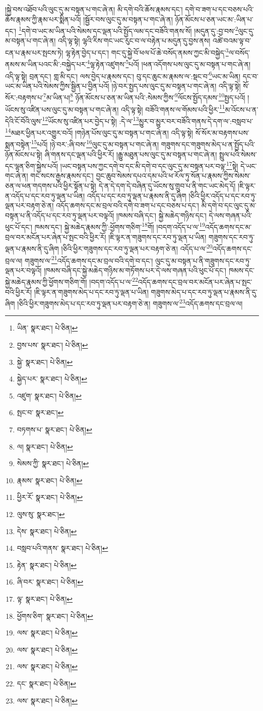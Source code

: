 །སྐྱེ་བས་འཐོབ་པའི་ལུང་དུ་མ་བསྟན་པ་གང་ཞེ་ན། མི་དགེ་བའི་ཆོས་རྣམས་དང་། དགེ་བ་ཟག་པ་དང་བཅས་པའི་ཆོས་རྣམས་ཀྱི་རྣམ་པར་སྨིན་པའོ། །སྦྱོར་བས་ལུང་དུ་མ་བསྟན་པ་གང་ཞེ་ན། ཉོན་མོངས་པ་ཅན་ཡང་མ་:ཡིན་པ་དང་། \footnote{ཡིན་  སྣར་ཐང་།  པེ་ཅིན། }དགེ་བ་ཡང་མ་ཡིན་པའི་སེམས་དང་ལྡན་པའི་སྤྱོད་ལམ་དང་བཟོའི་གནས་སོ། །མདུན་དུ་:བྱ་བས་\footnote{བྱས་པས་  སྣར་ཐང་།  པེ་ཅིན། }ལུང་དུ་མ་བསྟན་པ་གང་ཞེ་ན། འདི་ལྟ་སྟེ། ལྷའི་རིས་གང་ཡང་རུང་བ་ལ་བརྟེན་པ་མདུན་དུ་བྱས་ནས། འཚེ་བའམ་ལྟ་བ་ངན་པ་རྣམ་པར་སྤངས་ཏེ། ལྷ་རྟེན་བྱེད་པ་དང་། གང་དུ་སྐྱེ་བོ་ཕལ་པོ་ཆེ་བསོད་ནམས་ཀྱང་མི་བསྐྱེད་\footnote{སྐྱེ་  སྣར་ཐང་།  པེ་ཅིན། }ལ་བསོད་ནམས་མ་ཡིན་པའང་མི་:བསྐྱེད་པར་\footnote{སྐྱེད་པར་  སྣར་ཐང་།  པེ་ཅིན། }ལྷ་རྟེན་འཛུགས་\footnote{འཛུག་  སྣར་ཐང་།  པེ་ཅིན། }པའོ། །ཕན་འདོགས་པས་ལུང་དུ་མ་བསྟན་པ་གང་ཞེ་ན། འདི་ལྟ་སྟེ། བྲན་དང་། གླ་མི་དང་། ལས་བྱེད་པ་རྣམས་དང་། བུ་དང་ཆུང་མ་རྣམས་ལ་:སྡང་བ་\footnote{སྤང་བ་  སྣར་ཐང་། }ཡང་མ་ཡིན། དང་བ་ཡང་མ་ཡིན་པའི་སེམས་ཀྱིས་སྦྱིན་པ་བྱིན་པའོ། །ཉེ་བར་སྤྱད་པས་ལུང་དུ་མ་བསྟན་པ་གང་ཞེ་ན། འདི་ལྟ་སྟེ། སོ་སོར་:བརྟགས་པ་\footnote{བཏགས་པ་  སྣར་ཐང་།  པེ་ཅིན། }མ་ཡིན་པ།\footnote{ལ།  སྣར་ཐང་།  པེ་ཅིན། } ཉོན་མོངས་པ་ཅན་མ་ཡིན་པའི་:སེམས་ཀྱིས་\footnote{སེམས་ཀྱི་  སྣར་ཐང་།  པེ་ཅིན། }ལོངས་སྤྱོད་དམས་\footnote{རྣམས་  སྣར་ཐང་།  པེ་ཅིན། }སྤྱད་པའོ། །ཡོངས་སུ་འཛིན་པས་ལུང་དུ་མ་བསྟན་པ་གང་ཞེ་ན། འདི་ལྟ་སྟེ། བཟོའི་གནས་ལ་གོམས་པའི་ཕྱིར་\footnote{ཕྱིར་རོ་  སྣར་ཐང་།  པེ་ཅིན། }མ་འོངས་པ་ན་དེའི་ངོ་བོའི་ལུས་\footnote{ལུས་སུ་  སྣར་ཐང་། }ཡོངས་སུ་འཛིན་པར་བྱེད་པ་སྟེ། :དེ་ལ་\footnote{དེས་  སྣར་ཐང་།  པེ་ཅིན། }མྱུར་བ་མྱུར་བར་བཟོའི་གནས་དེ་དག་ལ་:བསླབ་པ་\footnote{བསླབ་པའི་གནས་  སྣར་ཐང་།  པེ་ཅིན། }མཐར་ཕྱིན་པར་འགྱུར་བའོ། །གཉེན་པོས་ལུང་དུ་མ་བསྟན་པ་གང་ཞེ་ན། འདི་ལྟ་སྟེ། སོ་སོར་མ་བརྟགས་པས་སྨན་བསྟེན་\footnote{རྟེན་  སྣར་ཐང་།  པེ་ཅིན། }པའོ། །ཉེ་བར་:ཞི་བས་\footnote{ཞི་བར་  སྣར་ཐང་།  པེ་ཅིན། }ལུང་དུ་མ་བསྟན་པ་གང་ཞེ་ན། གཟུགས་དང་གཟུགས་མེད་པ་ན་སྤྱོད་པའི་ཉོན་མོངས་པ་སྟེ། ཞི་གནས་དང་ལྡན་པའི་ཕྱིར་རོ། །རྒྱུ་མཐུན་པས་ལུང་དུ་མ་བསྟན་པ་གང་ཞེ་ན། སྤྲུལ་པའི་སེམས་དང་ལྷན་ཅིག་སྐྱེས་པའོ། །ཡང་བསྟན་པས་ཀྱང་དགེ་བ་དང་མི་དགེ་བ་དང་ལུང་དུ་མ་བསྟན་པར་བལྟ་\footnote{ལྟ་  སྣར་ཐང་།  པེ་ཅིན། }སྟེ། དེ་ཡང་གང་ཞེ་ན། གང་སངས་རྒྱས་རྣམས་དང་། བྱང་ཆུབ་སེམས་དཔའ་དམ་པའི་ཕ་རོལ་ཏུ་སོན་པ་རྣམས་ཀྱིས་སེམས་ཅན་ལ་ཕན་གདགས་པའི་ཕྱིར་སྟོན་པ་སྟེ། དེ་ན་དེ་དག་དེ་བཞིན་དུ་ཡོངས་སུ་གྲུབ་པ་ནི་གང་ཡང་མེད་དོ། །ཇི་ལྟར་ན་འདོད་པ་དང་རབ་ཏུ་ལྡན་པ་ཡིན། འདོད་པ་དང་རབ་ཏུ་ལྡན་པ་རྣམས་ནི་དུ་ཞིག །ཅིའི་ཕྱིར་འདོད་པ་དང་རབ་ཏུ་ལྡན་པར་བརྟག་ཅེ་ན། འདོད་ཆགས་དང་མ་བྲལ་བའི་དགེ་བ་ཟག་པ་དང་བཅས་པ་དང་། མི་དགེ་བ་དང་ལུང་དུ་མ་བསྟན་པ་ནི་འདོད་པ་དང་རབ་ཏུ་ལྡན་པར་བལྟའོ། །ཁམས་བཞི་དང་། སྐྱེ་མཆེད་གཉིས་དང་། དེ་ལས་གཞན་པའི་ཕུང་པོ་དང་། ཁམས་དང་། སྐྱེ་མཆེད་རྣམས་ཀྱི་:ཕྱོགས་གཅིག་\footnote{ཕྱོགས་ཅིག་  སྣར་ཐང་།  པེ་ཅིན། }གོ། །བདག་འདོད་པ་ལ་\footnote{ལས་  སྣར་ཐང་།  པེ་ཅིན། }འདོད་ཆགས་དང་མ་བྲལ་བར་མངོན་པར་ཞེན་པ་སྤང་བའི་ཕྱིར་རོ། །ཇི་ལྟར་ན་གཟུགས་དང་རབ་ཏུ་ལྡན་པ་ཡིན། གཟུགས་དང་རབ་ཏུ་ལྡན་པ་རྣམས་ནི་དུ་ཞིག །ཅིའི་ཕྱིར་གཟུགས་དང་རབ་ཏུ་ལྡན་པར་བརྟག་ཅེ་ན། འདོད་པ་ལ་\footnote{ལས་  སྣར་ཐང་།  པེ་ཅིན། }འདོད་ཆགས་དང་བྲལ་ལ། གཟུགས་ལ་\footnote{ལས་  སྣར་ཐང་།  པེ་ཅིན། }འདོད་ཆགས་དང་མ་བྲལ་བའི་དགེ་བ་དང་། ལུང་དུ་མ་བསྟན་པ་ནི་གཟུགས་དང་རབ་ཏུ་ལྡན་པར་བལྟའོ། །ཁམས་བཞི་དང་སྐྱེ་མཆེད་གཉིས་མ་གཏོགས་པར་དེ་ལས་གཞན་པའི་ཕུང་པོ་དང་། ཁམས་དང་སྐྱེ་མཆེད་རྣམས་ཀྱི་ཕྱོགས་གཅིག་གོ། །བདག་འདོད་པ་ལ་\footnote{དང་  སྣར་ཐང་།  པེ་ཅིན། }འདོད་ཆགས་དང་བྲལ་བར་མངོན་པར་ཞེན་པ་སྤང་བའི་ཕྱིར་རོ། །ཇི་ལྟར་ན་གཟུགས་མེད་པ་དང་རབ་ཏུ་ལྡན་པ་ཡིན། གཟུགས་མེད་པ་དང་རབ་ཏུ་ལྡན་པ་རྣམས་ནི་དུ་ཞིག །ཅིའི་ཕྱིར་གཟུགས་མེད་པ་དང་རབ་ཏུ་ལྡན་པར་བརྟག་ཅེ་ན། གཟུགས་ལ་\footnote{ལས་  སྣར་ཐང་།  པེ་ཅིན། }འདོད་ཆགས་དང་བྲལ་ལ། 